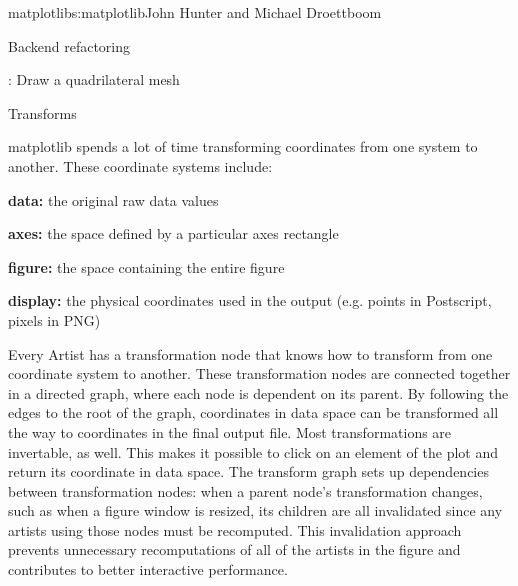 \begin{aosachapter}{matplotlib}{s:matplotlib}{John Hunter and Michael Droettboom}
\begin{aosasect1}{Backend refactoring}
\begin{aosaitemize}
  \item {}: Draw a quadrilateral mesh

\end{aosaitemize}

\end{aosasect1}

\begin{aosasect1}{Transforms}


matplotlib spends a lot of time transforming coordinates from one
system to another.  These coordinate systems include:

\begin{aosaitemize}
\item \textbf{data:} the original raw data values

\item \textbf{axes:} the space defined by a particular axes rectangle

\item \textbf{figure:} the space containing the entire figure

\item \textbf{display:} the physical coordinates used in the output
  (e.g. points in Postscript, pixels in PNG)
\end{aosaitemize}

Every Artist has a transformation node that knows how to transform
from one coordinate system to another.  These transformation nodes are
connected together in a directed graph, where each node is dependent
on its parent.  By following the edges to the root of the graph,
coordinates in data space can be transformed all the way to
coordinates in the final output file.  Most transformations are
invertable, as well.  This makes it possible to click on an element of
the plot and return its coordinate in data space.  The transform graph
sets up dependencies between transformation nodes: when a parent
node's transformation changes, such as when a figure window is
resized, its children are all invalidated since any artists using
those nodes must be recomputed.  This invalidation approach prevents
unnecessary recomputations of all of the artists in the figure and
contributes to better interactive performance.


\end{aosasect1}
\end{aosachapter}
